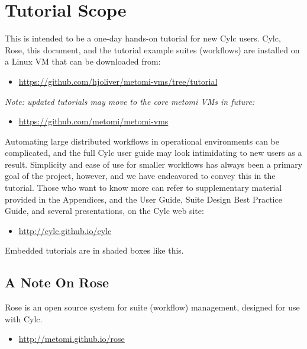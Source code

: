 \section{Tutorial Scope}

This is intended to be a one-day hands-on tutorial for new Cylc users. Cylc,
Rose, this document, and the tutorial example suites (workflows) are
installed on a Linux VM that can be downloaded from:
\begin{itemize}
    \item \url{https://github.com/hjoliver/metomi-vms/tree/tutorial}
\end{itemize}

{\em Note: updated tutorials may move to the core metomi VMs in future:}
\begin{itemize}
    \item \url{https://github.com/metomi/metomi-vms}
\end{itemize}

Automating large distributed workflows in operational environments can be
complicated, and the full Cylc user guide may look intimidating to new users as
a result. Simplicity and ease of use for smaller workflows has always been a
primary goal of the project, however, and we have endeavored to convey this in
the tutorial. Those who want to know more can refer to supplementary material
provided in the Appendices, and the User Guide, Suite Design Best Practice
Guide, and several presentations, on the Cylc web site:

\begin{itemize}
    \item \url{http://cylc.github.io/cylc}
\end{itemize}



\begin{shaded*}
Embedded tutorials are in shaded boxes like this.
\end{shaded*}

\subsection{A Note On Rose}

Rose is an open source system for suite (workflow) management, designed for use
with Cylc.
\begin{itemize}
     \item \url{http://metomi.github.io/rose}
\end{itemize}
 
